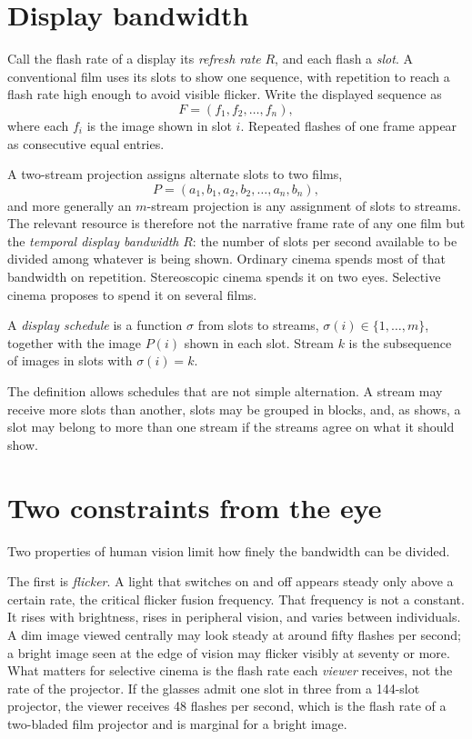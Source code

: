 \section{Display bandwidth}

Call the flash rate of a display its \emph{refresh rate} $R$, and each flash a \emph{slot}. A conventional film uses its slots to show one sequence, with repetition to reach a flash rate high enough to avoid visible flicker. Write the displayed sequence as
\begin{equation}
F=(f_1,f_2,\ldots,f_n),
\end{equation}
where each $f_i$ is the image shown in slot $i$. Repeated flashes of one frame appear as consecutive equal entries.

A two-stream projection assigns alternate slots to two films,
\begin{equation}
P=(a_1,b_1,a_2,b_2,\ldots,a_n,b_n),
\end{equation}
and more generally an $m$-stream projection is any assignment of slots to streams. The relevant resource is therefore not the narrative frame rate of any one film but the \emph{temporal display bandwidth} $R$: the number of slots per second available to be divided among whatever is being shown. Ordinary cinema spends most of that bandwidth on repetition. Stereoscopic cinema spends it on two eyes. Selective cinema proposes to spend it on several films.

\begin{definition}
A \emph{display schedule} is a function $\sigma$ from slots to streams, $\sigma(i)\in\{1,\ldots,m\}$, together with the image $P(i)$ shown in each slot. Stream $k$ is the subsequence of images in slots with $\sigma(i)=k$.
\end{definition}

The definition allows schedules that are not simple alternation. A stream may receive more slots than another, slots may be grouped in blocks, and, as  shows, a slot may belong to more than one stream if the streams agree on what it should show.

\section{Two constraints from the eye}

Two properties of human vision limit how finely the bandwidth can be divided.

The first is \emph{flicker}. A light that switches on and off appears steady only above a certain rate, the critical flicker fusion frequency. That frequency is not a constant. It rises with brightness, rises in peripheral vision, and varies between individuals. A dim image viewed centrally may look steady at around fifty flashes per second; a bright image seen at the edge of vision may flicker visibly at seventy or more. What matters for selective cinema is the flash rate each \emph{viewer} receives, not the rate of the projector. If the glasses admit one slot in three from a 144-slot projector, the viewer receives 48 flashes per second, which is the flash rate of a two-bladed film projector and is marginal for a bright image.

